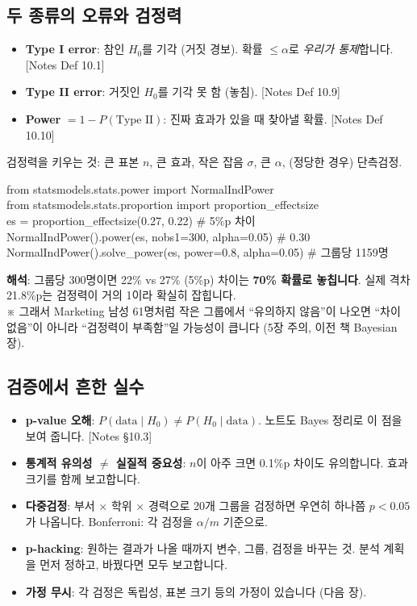 \documentclass[11pt,a4paper]{article}
\newcommand{\term}[1]{\textbf{#1}}
\newcommand{\nref}[1]{{\footnotesize\textsf{\color{blue!55!black}[Notes #1]}}}
\newcommand{\aside}[1]{{\footnotesize\color{black!65}#1}}
\begin{document}
\subsection{두 종류의 오류와 검정력}
\begin{itemize}
\item \term{Type I error}: 참인 $H_0$를 기각 (거짓 경보). 확률 $\le\alpha$로 \emph{우리가 통제}합니다. \nref{Def 10.1}
\item \term{Type II error}: 거짓인 $H_0$를 기각 못 함 (놓침). \nref{Def 10.9}
\item \term{Power} $=1-P(\text{Type II})$: 진짜 효과가 있을 때 찾아낼 확률. \nref{Def 10.10}
\end{itemize}
검정력을 키우는 것: 큰 표본 $n$, 큰 효과, 작은 잡음 $\sigma$, 큰 $\alpha$, (정당한 경우) 단측검정.

\begin{codebox}
from statsmodels.stats.power import NormalIndPower\\
from statsmodels.stats.proportion import proportion\_effectsize\\
es = proportion\_effectsize(0.27, 0.22) \hfill \# 5\%p 차이\\
NormalIndPower().power(es, nobs1=300, alpha=0.05) \hfill \# 0.30\\
NormalIndPower().solve\_power(es, power=0.8, alpha=0.05) \hfill \# 그룹당 1159명
\end{codebox}
\textbf{해석}: 그룹당 300명이면 22\% vs 27\% (5\%p) 차이는 \textbf{70\% 확률로 놓칩니다}. 실제 격차 21.8\%p는 검정력이 거의 1이라 확실히 잡힙니다.\\
\aside{※ 그래서 Marketing 남성 61명처럼 작은 그룹에서 ``유의하지 않음''이 나오면 ``차이 없음''이 아니라 ``검정력이 부족함''일 가능성이 큽니다 (5장 주의, 이전 책 Bayesian 장).}

\subsection{검증에서 흔한 실수}
\begin{itemize}
\item \textbf{p-value 오해}: $P(\text{data}\mid H_0)\ne P(H_0\mid\text{data})$. 노트도 Bayes 정리로 이 점을 보여 줍니다. \nref{§10.3}
\item \textbf{통계적 유의성 $\ne$ 실질적 중요성}: $n$이 아주 크면 0.1\%p 차이도 유의합니다. 효과 크기를 함께 보고합니다.
\item \textbf{다중검정}: 부서 $\times$ 학위 $\times$ 경력으로 20개 그룹을 검정하면 우연히 하나쯤 $p<0.05$가 나옵니다. Bonferroni: 각 검정을 $\alpha/m$ 기준으로.
\item \textbf{p-hacking}: 원하는 결과가 나올 때까지 변수, 그룹, 검정을 바꾸는 것. 분석 계획을 먼저 정하고, 바꿨다면 모두 보고합니다.
\item \textbf{가정 무시}: 각 검정은 독립성, 표본 크기 등의 가정이 있습니다 (다음 장).
\end{itemize}
\end{document}
